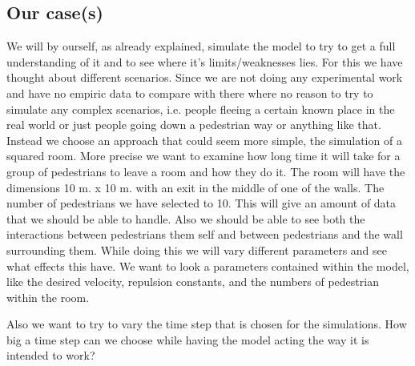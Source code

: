 

\subsection{Our case(s)}
We will by ourself, as already explained, simulate the model to try to get a full understanding of it and to see where it's limits/weaknesses lies. For this we have thought about different scenarios. Since we are not doing any experimental work and have no empiric data to compare with there where no reason to try to simulate any complex scenarios, i.e. people fleeing a certain known place in the real world or just people going down a pedestrian way or anything like that. Instead we choose an approach that could seem more simple, the simulation of a squared room. More precise we want to examine how long time it will take for a group of pedestrians to leave a room and how they do it. The room will have the dimensions 10 m. x 10 m. with an exit in the middle of one of the walls. The number of pedestrians we have selected to 10. This will give an amount of data that we should be able to handle. Also we should be able to see both the interactions between pedestrians them self and between pedestrians and the wall surrounding them.  While doing this we will vary different parameters and see what effects this have. We want to look a parameters contained within the model, like the desired velocity, repulsion constants, and the numbers of pedestrian within the room. 

Also we want to try to vary the time step that is chosen for the simulations. How big a time step can we choose while having the model acting the way it is intended to work?


